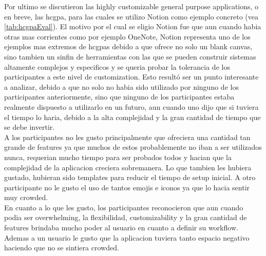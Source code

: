 Por ultimo se discutieron las highly customizable general purpose applications, o en breve, las hcgpa, para las cuales se utilizo Notion como ejemplo concreto (vea \ref{tab:hcgpaEval}). El motivo por el cual se eligio Notion fue que aun cuando habia otras mas corrientes como por ejemplo OneNote, Notion representa uno de los ejemplos mas extremos de hcgpas debido a que ofrece no solo un blank canvas, sino tambien un sinfin de herramientas con las que se pueden construir sistemas altamente complejos y especificos y se queria probar la tolerancia de los participantes a este nivel de customization. Esto resultó ser un punto interesante a analizar, debido a que no solo no habia sido utilizado por ninguno de los participantes anteriormente, sino que ninguno de los participantes estaba realmente dispuesto a utilizarlo en un futuro, aun cuando uno dijo que si tuviera el tiempo lo haria, debido a la alta complejidad y la gran cantidad de tiempo que se debe invertir.\\
A los participantes no les gusto principalmente que ofreciera una cantidad tan grande de features ya que muchos de estos probablemente no iban a ser utilizados nunca, requerian mucho tiempo para ser probados todos y hacian que la complejidad de la aplicacion creciera sobremanera. Lo que tambien les hubiera gustado, hubieran sido templates para reducir el tiempo de setup inicial. A otro participante no le gusto el uso de tantos emojis e iconos ya que lo hacia sentir muy crowded.\\
En cuanto a lo que les gusto, los participantes reconocieron que aun cuando podia ser overwhelming, la flexibilidad, customizability y la gran cantidad de features brindaba mucho poder al usuario en cuanto a definir su workflow. Ademas a un usuario le gusto que la aplicacion tuviera tanto espacio negativo haciendo que no se sintiera crowded.

